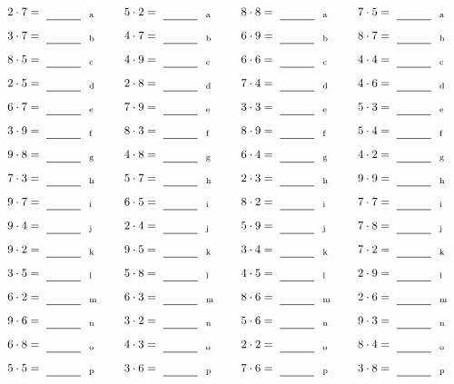\documentclass
[
  draft    = true,
  fontsize = 11pt,
  parskip  = half-
]
{scrartcl}
\begin{document}
\par\vfill\par
\begin{align*}
    \pline{2\cdot7}&=\rline{a}
  & \pline{5\cdot2}&=\rline{a}
  & \pline{8\cdot8}&=\rline{a}
  & \pline{7\cdot5}&=\rline{a} \\[1ex]
    \pline{3\cdot7}&=\rline{b}
  & \pline{4\cdot7}&=\rline{b}
  & \pline{6\cdot9}&=\rline{b}
  & \pline{8\cdot7}&=\rline{b} \\[1ex]
    \pline{8\cdot5}&=\rline{c}
  & \pline{4\cdot9}&=\rline{c}
  & \pline{6\cdot6}&=\rline{c}
  & \pline{4\cdot4}&=\rline{c} \\[1ex]
    \pline{2\cdot5}&=\rline{d}
  & \pline{2\cdot8}&=\rline{d}
  & \pline{7\cdot4}&=\rline{d}
  & \pline{4\cdot6}&=\rline{d} \\[1ex]
    \pline{6\cdot7}&=\rline{e}
  & \pline{7\cdot9}&=\rline{e}
  & \pline{3\cdot3}&=\rline{e}
  & \pline{5\cdot3}&=\rline{e} \\[1ex]
    \pline{3\cdot9}&=\rline{f}
  & \pline{8\cdot3}&=\rline{f}
  & \pline{8\cdot9}&=\rline{f}
  & \pline{5\cdot4}&=\rline{f} \\[1ex]
    \pline{9\cdot8}&=\rline{g}
  & \pline{4\cdot8}&=\rline{g}
  & \pline{6\cdot4}&=\rline{g}
  & \pline{4\cdot2}&=\rline{g} \\[1ex]
    \pline{7\cdot3}&=\rline{h}
  & \pline{5\cdot7}&=\rline{h}
  & \pline{2\cdot3}&=\rline{h}
  & \pline{9\cdot9}&=\rline{h} \\[1ex]
    \pline{9\cdot7}&=\rline{i}
  & \pline{6\cdot5}&=\rline{i}
  & \pline{8\cdot2}&=\rline{i}
  & \pline{7\cdot7}&=\rline{i} \\[1ex]
    \pline{9\cdot4}&=\rline{j}
  & \pline{2\cdot4}&=\rline{j}
  & \pline{5\cdot9}&=\rline{j}
  & \pline{7\cdot8}&=\rline{j} \\[1ex]
    \pline{9\cdot2}&=\rline{k}
  & \pline{9\cdot5}&=\rline{k}
  & \pline{3\cdot4}&=\rline{k}
  & \pline{7\cdot2}&=\rline{k} \\[1ex]
    \pline{3\cdot5}&=\rline{l}
  & \pline{5\cdot8}&=\rline{l}
  & \pline{4\cdot5}&=\rline{l}
  & \pline{2\cdot9}&=\rline{l} \\[1ex]
    \pline{6\cdot2}&=\rline{m}
  & \pline{6\cdot3}&=\rline{m}
  & \pline{8\cdot6}&=\rline{m}
  & \pline{2\cdot6}&=\rline{m} \\[1ex]
    \pline{9\cdot6}&=\rline{n}
  & \pline{3\cdot2}&=\rline{n}
  & \pline{5\cdot6}&=\rline{n}
  & \pline{9\cdot3}&=\rline{n} \\[1ex]
    \pline{6\cdot8}&=\rline{o}
  & \pline{4\cdot3}&=\rline{o}
  & \pline{2\cdot2}&=\rline{o}
  & \pline{8\cdot4}&=\rline{o} \\[1ex]
    \pline{5\cdot5}&=\rline{p}
  & \pline{3\cdot6}&=\rline{p}
  & \pline{7\cdot6}&=\rline{p}
  & \pline{3\cdot8}&=\rline{p}
\end{align*}
\end{document}
